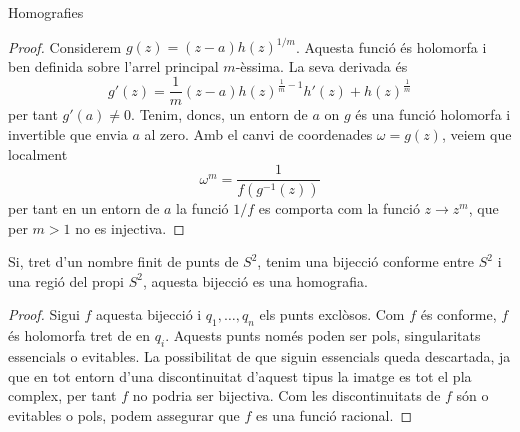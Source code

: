 \documentclass[dvipsnames, svgnames, leqno, a4paper, 12pt]{report}
\begin{document}
\begin{chapter}{Homografies}
\begin{proof}
            Considerem \begin{math}
                g(z)=(z-a)h(z)^{1/m}
            \end{math}. Aquesta funció és holomorfa i ben definida sobre l'arrel principal $m$-èssima. La seva derivada és 
            \begin{displaymath}
                g'(z)=\frac{1}{m}(z-a)h(z)^{\frac{1}{m}-1}h'(z)+h(z)^{\frac{1}{m}}
            \end{displaymath} per tant $g'(a)\neq0$.
            Tenim, doncs, un entorn de $a$ on $g$ és una funció holomorfa i invertible que envia $a$ al zero. Amb el canvi de coordenades $\omega = g(z)$, veiem que localment \begin{displaymath}
                \omega^m = \frac{1}{f(g^{-1}(z))}
            \end{displaymath} per tant en un entorn de $a$ la funció $1/f$ es comporta com la funció $z\to z^m$, que per $m>1$ no es injectiva.
        \end{proof}
        \begin{theorem}
            Si, tret d'un nombre finit de punts de $S^2$, tenim una bijecció conforme entre $S^2$ i una regió del propi $S^2$, aquesta bijecció es una homografia.
        \end{theorem}
        \begin{proof}
            Sigui $f$ aquesta bijecció i $q_1,\dots,q_n$ els punts exclòsos. Com $f$ és conforme, $f$ és holomorfa tret de en $q_i$. Aquests punts només poden ser pols, singularitats essencials o evitables. La possibilitat de que siguin essencials queda descartada, ja que en tot entorn d'una discontinuitat d'aquest tipus la imatge es tot el pla complex, per tant $f$ no podria ser bijectiva. Com les discontinuitats de $f$ són o evitables o pols, podem assegurar que $f$ es una funció racional. 
            

\end{proof}
\end{chapter}
\end{document}
